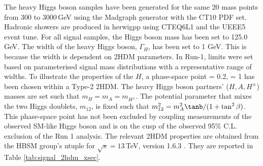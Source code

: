 The heavy Higgs boson samples have been generated for the same 20 mass points from 300 to 3000\,GeV using the Madgraph generator\cite{MG5aMCatNLO} with the 
CT10 PDF set. Hadronic showers are produced in herwigpp using CTEQ6L1 and the UEEE5 event tune. 
For all signal samples, the Higgs boson mass has been set to 125.0 GeV. The width of the heavy Higgs boson, $\Gamma_H$, has been set to 1 GeV. This is because the width is dependent on 2HDM parameters. In Run-1, limits were set based on parameterised signal mass distributions with a representative range of widths.
To illustrate the properties of the $H$, a phase-space point \cba = 0.2, \tanb = 1 has been chosen within a Type-2 2HDM. The heavy Higgs boson partners' ($H, A, H^{\pm}$) masses are set such that $m_H = m_A = m_{H^{\pm}}$. The potential parameter that mixes the two Higgs doublets, $m_{12}$, is fixed such that $m_{12}^2 = m_A^2\tanb/(1+\tan^2\beta)$. This phase-space point has not been excluded by coupling measurements of the observed SM-like Higgs boson and is on the cusp of the observed 95\% C.L. exclusion of the Run 1 \Htohhb analysis. The relevant 2HDM properties are obtained from the HBSM group's ntuple for $\sqrt{s} = 13$\,TeV, version 1.6.3 \cite{HBSMNtuple}. They are reported in Table \ref{tab:signal_2hdm_xsec}.

